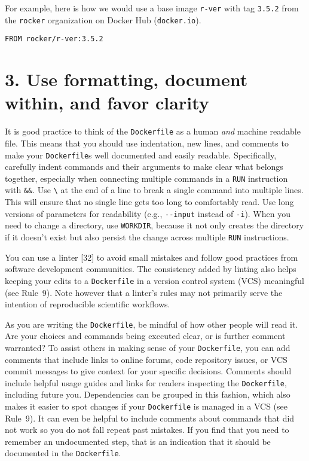 \documentclass[10pt,letterpaper]{article}
\begin{document}
For example, here is how we would use a base image \texttt{r-ver} with
tag \texttt{3.5.2} from the \texttt{rocker} organization on Docker Hub
(\texttt{docker.io}).

\begin{verbatim}
FROM rocker/r-ver:3.5.2
\end{verbatim}

\hypertarget{use-formatting-document-within-and-favor-clarity}{%
\section{3. Use formatting, document within, and favor
clarity}\label{use-formatting-document-within-and-favor-clarity}}

It is good practice to think of the \texttt{Dockerfile} as a human
\emph{and} machine readable file. This means that you should use
indentation, new lines, and comments to make your \texttt{Dockerfile}s
well documented and easily readable. Specifically, carefully indent
commands and their arguments to make clear what belongs together,
especially when connecting multiple commands in a \texttt{RUN}
instruction with \texttt{\&\&}. Use \texttt{\textbackslash{}} at the end
of a line to break a single command into multiple lines. This will
ensure that no single line gets too long to comfortably read. Use long
versions of parameters for readability (e.g., \texttt{-\/-input} instead
of \texttt{-i}). When you need to change a directory, use
\texttt{WORKDIR}, because it not only creates the directory if it
doesn't exist but also persist the change across multiple \texttt{RUN}
instructions.

You can use a linter {[}32{]} to avoid small mistakes and follow good
practices from software development communities. The consistency added
by linting also helps keeping your edits to a \texttt{Dockerfile} in a
version control system (VCS) meaningful (see Rule~9). Note however that
a linter's rules may not primarily serve the intention of reproducible
scientific workflows.

As you are writing the \texttt{Dockerfile}, be mindful of how other
people will read it. Are your choices and commands being executed clear,
or is further comment warranted? To assist others in making sense of
your \texttt{Dockerfile}, you can add comments that include links to
online forums, code repository issues, or VCS commit messages to give
context for your specific decisions. Comments should include helpful
usage guides and links for readers inspecting the \texttt{Dockerfile},
including future you. Dependencies can be grouped in this fashion, which
also makes it easier to spot changes if your \texttt{Dockerfile} is
managed in a VCS (see Rule~9). It can even be helpful to include
comments about commands that did not work so you do not fall repeat past
mistakes. If you find that you need to remember an undocumented step,
that is an indication that it should be documented in the
\texttt{Dockerfile}.
\end{document}
